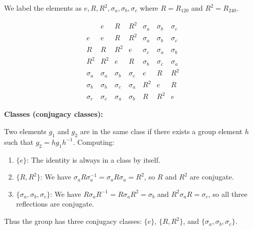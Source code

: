 \documentclass[12pt]{article}
\begin{document}
We label the elements as $e, R, R^2, \sigma_a, \sigma_b, \sigma_c$ where $R = R_{120}$ and $R^2 = R_{240}$.

\[
\begin{array}{c|cccccc}
 & e & R & R^2 & \sigma_a & \sigma_b & \sigma_c \\
\hline
e & e & R & R^2 & \sigma_a & \sigma_b & \sigma_c \\
R & R & R^2 & e & \sigma_c & \sigma_a & \sigma_b \\
R^2 & R^2 & e & R & \sigma_b & \sigma_c & \sigma_a \\
\sigma_a & \sigma_a & \sigma_b & \sigma_c & e & R & R^2 \\
\sigma_b & \sigma_b & \sigma_c & \sigma_a & R^2 & e & R \\
\sigma_c & \sigma_c & \sigma_a & \sigma_b & R & R^2 & e
\end{array}
\]

\medskip
\noindent\textbf{Classes (conjugacy classes):}

Two elements $g_1$ and $g_2$ are in the same class if there exists a group element $h$ such that $g_2 = h g_1 h^{-1}$. Computing:

\begin{enumerate}
\item $\{e\}$: The identity is always in a class by itself.

\item $\{R, R^2\}$: We have $\sigma_a R \sigma_a^{-1} = \sigma_a R \sigma_a = R^2$, so $R$ and $R^2$ are conjugate.

\item $\{\sigma_a, \sigma_b, \sigma_c\}$: We have $R \sigma_a R^{-1} = R \sigma_a R^2 = \sigma_b$ and $R^2 \sigma_a R = \sigma_c$, so all three reflections are conjugate.
\end{enumerate}

Thus the group has three conjugacy classes: $\{e\}$, $\{R, R^2\}$, and $\{\sigma_a, \sigma_b, \sigma_c\}$.
\end{document}
